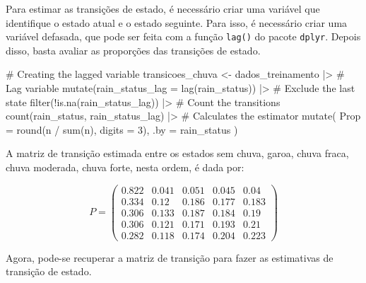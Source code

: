 \documentclass[
  letterpaper,
  DIV=11,
  numbers=noendperiod]{scrreprt}
\newenvironment{Shaded}{\begin{snugshade}}{\end{snugshade}}
\newcommand{\AttributeTok}[1]{\textcolor[rgb]{0.40,0.45,0.13}{#1}}
\newcommand{\CommentTok}[1]{\textcolor[rgb]{0.37,0.37,0.37}{#1}}
\newcommand{\DecValTok}[1]{\textcolor[rgb]{0.68,0.00,0.00}{#1}}
\newcommand{\FunctionTok}[1]{\textcolor[rgb]{0.28,0.35,0.67}{#1}}
\newcommand{\NormalTok}[1]{\textcolor[rgb]{0.00,0.23,0.31}{#1}}
\newcommand{\OtherTok}[1]{\textcolor[rgb]{0.00,0.23,0.31}{#1}}
\newcommand{\SpecialCharTok}[1]{\textcolor[rgb]{0.37,0.37,0.37}{#1}}
\begin{document}
Para estimar as transições de estado, é necessário criar uma variável
que identifique o estado atual e o estado seguinte. Para isso, é
necessário criar uma variável defasada, que pode ser feita com a função
\texttt{lag()} do pacote \texttt{dplyr}. Depois disso, basta avaliar as
proporções das transições de estado.

\begin{Shaded}
\begin{Highlighting}[]
\CommentTok{\# Creating the lagged variable}
\NormalTok{transicoes\_chuva }\OtherTok{\textless{}{-}}
\NormalTok{    dados\_treinamento }\SpecialCharTok{|\textgreater{}}
    \CommentTok{\# Lag variable}
    \FunctionTok{mutate}\NormalTok{(}\AttributeTok{rain\_status\_lag =} \FunctionTok{lag}\NormalTok{(rain\_status)) }\SpecialCharTok{|\textgreater{}}
    \CommentTok{\# Exclude the last state}
    \FunctionTok{filter}\NormalTok{(}\SpecialCharTok{!}\FunctionTok{is.na}\NormalTok{(rain\_status\_lag)) }\SpecialCharTok{|\textgreater{}}
    \CommentTok{\# Count the transitions}
    \FunctionTok{count}\NormalTok{(rain\_status, rain\_status\_lag) }\SpecialCharTok{|\textgreater{}}
    \CommentTok{\# Calculates the estimator}
    \FunctionTok{mutate}\NormalTok{(}
        \AttributeTok{Prop =} \FunctionTok{round}\NormalTok{(n }\SpecialCharTok{/} \FunctionTok{sum}\NormalTok{(n), }\AttributeTok{digits =} \DecValTok{3}\NormalTok{),}
        \AttributeTok{.by =}\NormalTok{ rain\_status}
\NormalTok{    )}
\end{Highlighting}
\end{Shaded}

A matriz de transição estimada entre os estados sem chuva, garoa, chuva
fraca, chuva moderada, chuva forte, nesta ordem, é dada por:

\begin{equation}
P =
\begin{pmatrix}
0.822 & 0.041 &  0.051 & 0.045 &  0.04 \\
0.334 & 0.12 &  0.186 & 0.177 &  0.183 \\
0.306 & 0.133 &  0.187 & 0.184 &  0.19 \\
0.306 & 0.121 &  0.171 & 0.193 &  0.21 \\
0.282 & 0.118 &  0.174 & 0.204 &  0.223 
\end{pmatrix}
\end{equation}

Agora, pode-se recuperar a matriz de transição para fazer as estimativas
de transição de estado.
\end{document}
